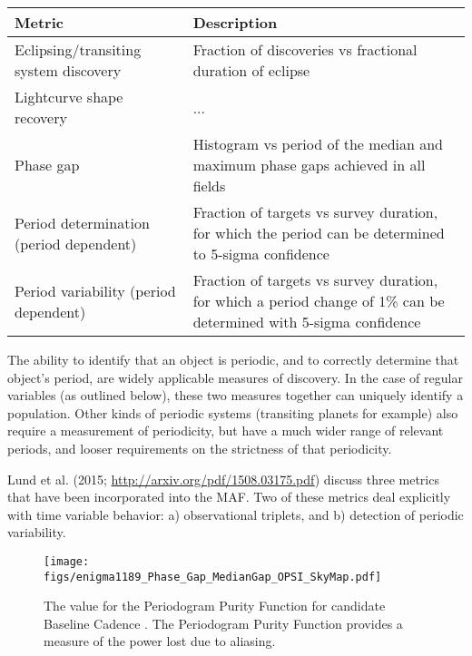 
\begin{center}
\begin{tabular}{| p{5cm} |p{10cm} |}
\hline Metric & Description\\
\hline
Eclipsing/transiting system discovery & Fraction of discoveries vs fractional duration of eclipse\\
Lightcurve shape recovery & ... \\
Phase gap & Histogram vs period of the median and maximum phase gaps achieved in all fields\\
Period determination (period dependent) & Fraction of targets vs survey duration, for which the period can be determined to 5-sigma confidence\\
Period variability (period dependent) & Fraction of targets vs survey duration, for which a period change of 1\% can be determined with 5-sigma confidence\\
  \hline \end{tabular}
 \end{center}

The ability to identify that an object is periodic, and to correctly determine that object's period, are widely applicable measures of discovery. In the case of regular variables (as outlined below), these two measures together can uniquely identify a population. Other kinds of periodic systems (transiting planets for example) also require a measurement of periodicity, but have a much wider range of relevant periods, and looser requirements on the strictness of that periodicity. 

Lund et al. (2015; \url{http://arxiv.org/pdf/1508.03175.pdf}) discuss three metrics that have been incorporated into the MAF. Two of these metrics deal explicitly with time variable behavior: a) observational triplets, and b) detection of periodic variability. 

\begin{figure}[tbh!]
\texttt{[image: figs/enigma1189\_Phase\_Gap\_MedianGap\_OPSI\_SkyMap.pdf]}
\caption{The value for the Periodogram Purity Function for candidate Baseline Cadence .
The Periodogram Purity Function provides a measure of the power lost due to aliasing.}
\label{fig:enigmaPeriodogramPurity}
\end{figure}


